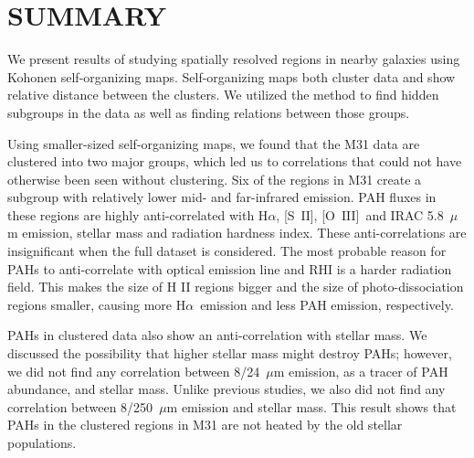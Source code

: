 \documentclass[useAMS,usenatbib]{mn2e}
\newcommand \halpha    {H$\alpha $}
\newcommand \sii {[S~{\textsc II}]}
\newcommand \oiii {[O~{\textsc III}]}
\begin{document}

\section{SUMMARY}
\label{sec: summary}

We present results of studying spatially resolved regions in nearby galaxies using Kohonen self-organizing maps.
Self-organizing maps both cluster data and show relative distance between the clusters. 
We utilized the method to find hidden subgroups in the data as well as finding relations between those groups.

Using smaller-sized self-organizing maps, we found that the M31 data are clustered into two major groups, which led us to correlations that could not have otherwise been seen without clustering.
Six of the regions in M31 create a subgroup with relatively lower mid- and far-infrared emission.
PAH fluxes in these regions are highly anti-correlated with \halpha, \sii, \oiii~and IRAC 5.8~$\mu$m emission, stellar mass and radiation hardness index.
These anti-correlations are insignificant when the full dataset is considered.
The most probable reason for PAHs to anti-correlate with optical emission line and RHI is a harder radiation field.
This makes the size of H {\sc II} regions bigger and the size of photo-dissociation regions smaller, causing more \halpha~emission and less PAH emission, respectively.

PAHs in clustered data also show an anti-correlation with stellar mass.
We discussed the possibility that higher stellar mass might destroy PAHs;
however, we did not find any correlation between 8/24~$\mu$m emission, as a tracer of PAH abundance, and stellar mass.
Unlike previous studies, we also did not find any correlation between 8/250~$\mu$m emission and stellar mass. 
This result shows that PAHs in the clustered regions in M31 are not heated by the old stellar populations.
\end{document}
